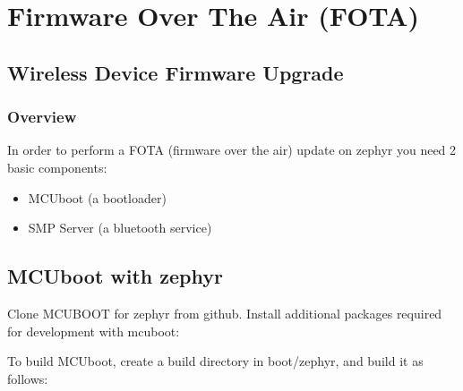 \documentclass[letterpaper,10pt,english]{sphinxmanual}
\begin{document}
\chapter{Firmware Over The Air (FOTA)}
\label{\detokenize{fota/fota:firmware-over-the-air-fota}}\label{\detokenize{fota/fota:fota}}\label{\detokenize{fota/fota::doc}}

\section{Wireless Device Firmware Upgrade}
\label{\detokenize{fota/mcuboot:wireless-device-firmware-upgrade}}\label{\detokenize{fota/mcuboot:mcuboot}}\label{\detokenize{fota/mcuboot::doc}}

\subsection{Overview}
\label{\detokenize{fota/mcuboot:overview}}
In order to perform a FOTA (firmware over the air) update on zephyr you need 2 basic components:
\begin{itemize}
\item {} 
MCUboot   (a bootloader)

\item {} 
SMP Server (a bluetooth service)

\end{itemize}


\section{MCUboot with zephyr}
\label{\detokenize{fota/mcuboot:mcuboot-with-zephyr}}\label{\detokenize{fota/mcuboot:id1}}
Clone MCUBOOT for zephyr from github.
Install additional packages required for development with mcuboot:

\begin{sphinxVerbatim}[commandchars=\\\{\}]
   
    
\end{sphinxVerbatim}

To build MCUboot, create a build directory in boot/zephyr, and build
it as follows:

\begin{sphinxVerbatim}[commandchars=\\\{\}]
 
    
   
\end{sphinxVerbatim}
\end{document}
